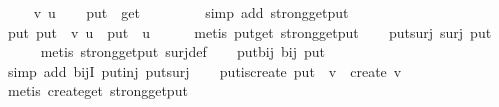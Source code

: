 \begin{isabellebody}
%
\isadelimproof
%
\endisadelimproof
%
\isatagproof
{}\isamarkupfalse%
\isanewline
\ \ \isamarkupfalse%
\ {\isasymsigma}\ v\ u\isanewline
\ \ \isamarkupfalse%
\ {\isachardoublequoteopen}put\ {\isasymsigma}\ {\isacharparenleft}get\ {\isasymsigma}{\isacharparenright}\ {\isacharequal}\ {\isasymsigma}{\isachardoublequoteclose}\isanewline
\ \ \ \ \isamarkupfalse%
\ {\isacharparenleft}simp\ add{\isacharcolon}\ strong{\isacharunderscore}get{\isacharunderscore}put{\isacharparenright}\isanewline
\ \ \isamarkupfalse%
\ {\isachardoublequoteopen}put\ {\isacharparenleft}put\ {\isasymsigma}\ v{\isacharparenright}\ u\ {\isacharequal}\ put\ {\isasymsigma}\ u{\isachardoublequoteclose}\isanewline
\ \ \ \ \isamarkupfalse%
\ {\isacharparenleft}metis\ put{\isacharunderscore}get\ strong{\isacharunderscore}get{\isacharunderscore}put{\isacharparenright}\isanewline
{}\isamarkupfalse%
%
\endisatagproof
{\isafoldproof}%
%
\isadelimproof
\isanewline
%
\endisadelimproof
\isanewline
\ \ \isamarkupfalse%
\ put{\isacharunderscore}surj{\isacharcolon}\ {\isachardoublequoteopen}surj\ {\isacharparenleft}put\ {\isasymsigma}{\isacharparenright}{\isachardoublequoteclose}\isanewline
%
\isadelimproof
\ \ \ \ %
\endisadelimproof
%
\isatagproof
{}\isamarkupfalse%
\ {\isacharparenleft}metis\ strong{\isacharunderscore}get{\isacharunderscore}put\ surj{\isacharunderscore}def{\isacharparenright}%
\endisatagproof
{\isafoldproof}%
%
\isadelimproof
\isanewline
%
\endisadelimproof
\isanewline
\ \ \isamarkupfalse%
\ put{\isacharunderscore}bij{\isacharcolon}\ {\isachardoublequoteopen}bij\ {\isacharparenleft}put\ {\isasymsigma}{\isacharparenright}{\isachardoublequoteclose}\isanewline
%
\isadelimproof
\ \ \ \ %
\endisadelimproof
%
\isatagproof
{}\isamarkupfalse%
\ {\isacharparenleft}simp\ add{\isacharcolon}\ bijI\ put{\isacharunderscore}inj\ put{\isacharunderscore}surj{\isacharparenright}%
\endisatagproof
{\isafoldproof}%
%
\isadelimproof
\isanewline
%
\endisadelimproof
\isanewline
\ \ \isamarkupfalse%
\ put{\isacharunderscore}is{\isacharunderscore}create{\isacharcolon}\ {\isachardoublequoteopen}put\ {\isasymsigma}\ v\ {\isacharequal}\ create\ v{\isachardoublequoteclose}\isanewline
%
\isadelimproof
\ \ \ \ %
\endisadelimproof
%
\isatagproof
{}\isamarkupfalse%
\ {\isacharparenleft}metis\ create{\isacharunderscore}get\ strong{\isacharunderscore}get{\isacharunderscore}put{\isacharparenright}%
\endisatagproof
{\isafoldproof}%

\end{isabellebody}
